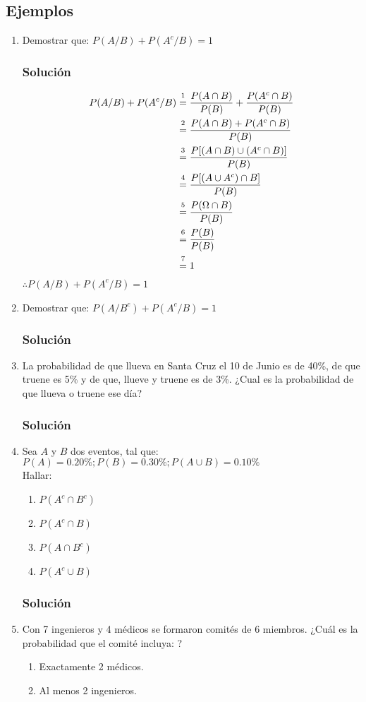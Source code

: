 \subsection{Ejemplos}
\begin{enumerate}
\item Demostrar que: $P(A/B)+P(A^c/B)=1$
\subsubsection{Solución}
\begin{align*}
P(A/B)+P(A^c/B) &\varstackrel{1}{=} \dfrac{P(A\cap B)}{P(B)} + \dfrac{P(A^c\cap B)}{P(B)} \\
  &\varstackrel{2}{=} \dfrac{P(A\cap B)+P(A^c\cap B)}{P(B)} \\
    &\varstackrel{3}{=} \dfrac{P[(A\cap B)\cup(A^c\cap B)]}{P(B)} \\
      &\varstackrel{4}{=} \dfrac{P[(A\cup A^c)\cap B]}{P(B)} \\
        &\varstackrel{5}{=} \dfrac{P(\Omega\cap B)}{P(B)} \\
           &\varstackrel{6}{=} \dfrac{P(B)}{P(B)} \\
                 &\varstackrel{7}{=} 1 \\
\end{align*}
$\therefore P(A/B)+P(A^c/B)=1$
\item Demostrar que: $P(A/B^c)+P(A^c/B)=1$
\subsubsection{Solución}
\item La probabilidad de que llueva en Santa Cruz el 10 de Junio es de 40\%, de que truene es 5\% y de que, llueve y truene es de 3\%. ¿Cual es la probabilidad de que llueva o truene ese día?
\subsubsection{Solución}
\item Sea $A$ y $B$ dos eventos, tal que: $P(A)=0.20\% ; P(B)=0.30\%;P(A\cup B)=0.10\%$ \\ Hallar:
\begin{enumerate}
\item $P(A^c\cap B^c)$
\item $P(A^c\cap B)$
\item $P(A\cap B^c)$
\item $P(A^c\cup B)$
\end{enumerate}
\subsubsection{Solución}
\item Con 7 ingenieros y 4 médicos se formaron comités de 6 miembros. ¿Cuál es la probabilidad que el comité incluya: ?
\begin{enumerate}
\item Exactamente 2 médicos.
\item Al menos 2 ingenieros.
\end{enumerate}

\end{enumerate}
